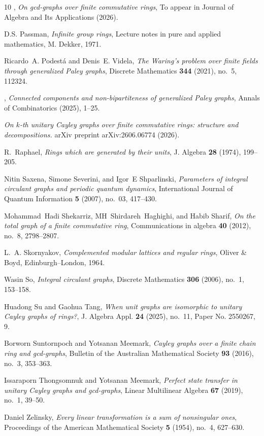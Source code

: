 \documentclass[11pt, a4paper]{amsart}
\theoremstyle{definition}
\numberwithin{equation}{section}
\begin{document}
\begin{thebibliography}{10}
\bysame, \emph{On gcd-graphs over finite commutative rings}, To appear in Journal of Algebra and Its Applications (2026).

D.S. Passman, \emph{Infinite group rings}, Lecture notes in pure and applied mathematics, M. Dekker, 1971.

Ricardo~A. Podest{\'a} and Denis~E. Videla, \emph{The {Waring}’s problem over finite fields through generalized {Paley} graphs}, Discrete Mathematics \textbf{344} (2021), no.~5, 112324.

\bysame, \emph{Connected components and non-bipartiteness of generalized {P}aley graphs}, Annals of Combinatorics (2025), 1--25.

\bysame \emph{On $ k $-th unitary Cayley graphs over finite commutative rings: structure and decompositions.} arXiv preprint arXiv:2606.06774 (2026).

R.~Raphael, \emph{Rings which are generated by their units}, J. Algebra \textbf{28} (1974), 199--205.

Nitin Saxena, Simone Severini, and Igor~E Shparlinski, \emph{Parameters of integral circulant graphs and periodic quantum dynamics}, International Journal of Quantum Information \textbf{5} (2007), no.~03, 417--430.

Mohammad~Hadi Shekarriz, MH~Shirdareh~Haghighi, and Habib Sharif, \emph{On the total graph of a finite commutative ring}, Communications in algebra \textbf{40} (2012), no.~8, 2798--2807.

L.~A. Skornyakov, \emph{Complemented modular lattices and regular rings}, Oliver \& Boyd, Edinburgh--London, 1964.

Wasin So, \emph{Integral circulant graphs}, Discrete Mathematics \textbf{306} (2006), no.~1, 153--158.

Huadong Su and Gaohua Tang, \emph{When unit graphs are isomorphic to unitary {C}ayley graphs of rings?}, J. Algebra Appl. \textbf{24} (2025), no.~11, Paper No. 2550267, 9. 

Borworn Suntornpoch and Yotsanan Meemark, \emph{{Cayley} graphs over a finite chain ring and gcd-graphs}, Bulletin of the Australian Mathematical Society \textbf{93} (2016), no.~3, 353--363.

Issaraporn Thongsomnuk and Yotsanan Meemark, \emph{Perfect state transfer in unitary {C}ayley graphs and gcd-graphs}, Linear Multilinear Algebra \textbf{67} (2019), no.~1, 39--50. 

Daniel Zelinsky, \emph{Every linear transformation is a sum of nonsingular ones}, Proceedings of the American Mathematical Society \textbf{5} (1954), no.~4, 627--630.

\end{thebibliography}

%
%
\end{document}
